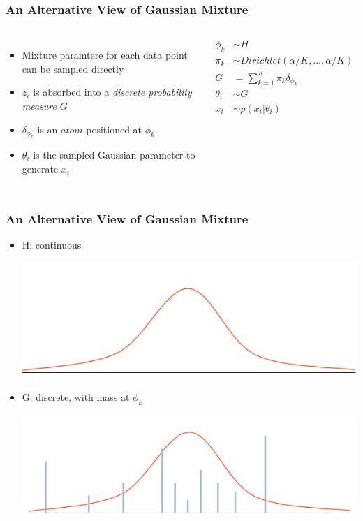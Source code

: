 \documentclass{beamer}
\begin{document}
\begin{frame}
	\frametitle{An Alternative View of Gaussian Mixture}
	
	\begin{columns}
		\begin{itemize}
			\item	Mixture paramtere for each data point can be sampled directly
			\item	$z_i$ is absorbed into a {\em discrete probability measure} $G$
			\item	$\delta_{\phi_k}$ is an $atom$ positioned at $\phi_k$
			\item	$\theta_i$ is the sampled Gaussian parameter to generate $x_i$
		\end{itemize}
		\begin{align*}		
		\phi_k & \sim H \\
		\pi_k & \sim Dirichlet(\alpha/K, \ldots, \alpha/K) \\
		G & = \sum_{k=1}^{K}\pi_k\delta_{\phi_k} \\
		\theta_i & \sim G \\
		x_i & \sim p(x_i | \theta_i)
		\end{align*}
	\end{columns}	
\end{frame}

\begin{frame}
	\frametitle{An Alternative View of Gaussian Mixture}
	\begin{itemize}
		\item H: continuous
		\begin{center}
			\includegraphics[width=.6\textwidth]{img/H.png}
		\end{center}
		\item G: discrete, with mass at $\phi_k$
		\begin{center}
			\includegraphics[width=.6\textwidth]{img/G.png}
		\end{center}
	\end{itemize}
\end{frame}
\end{document}
